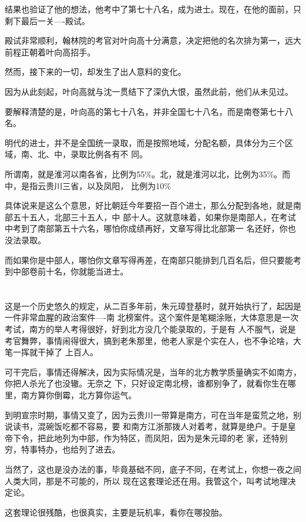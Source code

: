 \documentclass[11pt,a4paper,onecolumn]{article}
\begin{document}
结果也验证了他的想法，他考中了第七十八名，成为进士。现在，在他的面前，只剩下最后一关----殿试。

殿试非常顺利，翰林院的考官对叶向高十分满意，决定把他的名次排为第一，远大前程正朝着叶向高招手。

然而，接下来的一切，却发生了出人意料的变化。

因为从此刻起，叶向高就与沈一贯结下了深仇大恨，虽然此前，他们从未见过。

要解释清楚的是，叶向高的第七十八名，并非全国七十八名，而是南卷第七十八名。

明代的进士，并不是全国统一录取，而是按照地域，分配名额，具体分为三个区域，南、北、中，录取比例各有不
同。

所谓南，就是淮河以南各省，比例为55\%。北，就是淮河以北，比例为35\%。而中，是指云贵川三省，以及凤阳，
比例为10\%

具体说来是这么个意思，好比朝廷今年要招一百个进士，那么分配到各地，就是南部五十五人，北部三十五人，中
部十人。这就意味着，如果你是南部人，在考试中考到了南部第五十六名，哪怕你成绩再好，文章写得比北部第一
名还好，你也没法录取。

而如果你是中部人，哪怕你文章写得再差，在南部只能排到几百名后，但只要能考到中部卷前十名，你就能当进士。

\section[\thesection]{}

这是一个历史悠久的规定，从二百多年前，朱元璋登基时，就开始执行了，起因是一件非常血腥的政治案件----南
北榜案件。这个案件是笔糊涂账，大体意思是一次考试，南方的举人考得很好，好到北方没几个能录取的，于是有
人不服气，说是考官舞弊，事情闹得很大，搞到老朱那里，他老人家是个实在人，也不争论啥，大笔一挥就干掉了
上百人。

可干完后，事情还得解决，因为实际情况是，当年的北方教学质量确实不如南方，你把人杀光了也没辙。无奈之
下，只好设定南北榜，谁都别争了，就看你生在哪里，南方算你倒霉，北方算你运气。

到明宣宗时期，事情又变了，因为云贵川一带算是南方，可在当年是蛮荒之地，别说读书，混碗饭吃都不容易，要
和南方江浙那拨人对着考，就算是绝户。于是皇帝下令，把此地列为中部，作为特区，而凤阳，因为是朱元璋的老
家，还特别穷，特事特办，也给列了进去。

当然了，这也是没办法的事，毕竟基础不同，底子不同，在考试上，你想一夜之间人类大同，那是不可能的，所以
现在这套理论还在用。我管这个，叫考试地理决定论。

这套理论很残酷，也很真实，主要是玩机率，看你在哪投胎。
\end{document}
